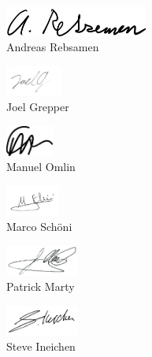 \documentclass[main.tex]{subfiles}
\begin{document}
\begin{flushleft}
    \begin{figure}[H]
        \includegraphics[height=1cm,]{AR}\\
        Andreas Rebsamen \\
    \end{figure}
    \begin{figure}[H]
        \includegraphics[height=1cm,]{JG}\\
        Joel Grepper\\
    \end{figure}
    \begin{figure}[H]
        \includegraphics[height=1cm,]{MO}\\
        Manuel Omlin\\
    \end{figure}
    \begin{figure}[H]
        \includegraphics[height=1cm,]{MS}\\
        Marco Schöni\\
    \end{figure}
    \begin{figure}[H]
        \includegraphics[height=1cm,]{PM}\\
        Patrick Marty\\
    \end{figure}
    \begin{figure}[H]
        \includegraphics[height=1cm,]{SI}\\
        Steve Ineichen\\
    \end{figure}
\end{flushleft}
\end{document}
